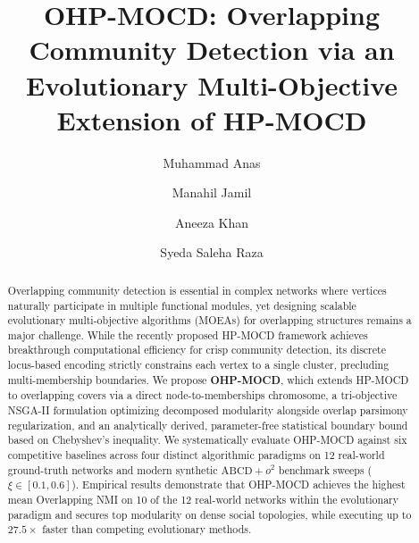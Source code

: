 \documentclass{svproc}
\begin{document}
\mainmatter

\title{OHP-MOCD: Overlapping Community Detection via an Evolutionary Multi-Objective Extension of HP-MOCD}

\author{Muhammad Anas \and Manahil Jamil \and Aneeza Khan  \and Syeda Saleha Raza}


\maketitle

\begin{abstract}
Overlapping community detection is essential in complex networks where vertices naturally participate in multiple functional modules, yet designing scalable evolutionary multi-objective algorithms (MOEAs) for overlapping structures remains a major challenge. While the recently proposed HP-MOCD framework achieves breakthrough computational efficiency for crisp community detection, its discrete locus-based encoding strictly constrains each vertex to a single cluster, precluding multi-membership boundaries. We propose \textbf{OHP-MOCD}, which extends HP-MOCD to overlapping covers via a direct node-to-memberships chromosome, a tri-objective NSGA-II formulation optimizing decomposed modularity alongside overlap parsimony regularization, and an analytically derived, parameter-free statistical boundary bound based on Chebyshev's inequality. We systematically evaluate OHP-MOCD against six competitive baselines across four distinct algorithmic paradigms on 12 real-world ground-truth networks and modern synthetic $\text{ABCD}+o^2$ benchmark sweeps ($\xi \in [0.1, 0.6]$). Empirical results demonstrate that OHP-MOCD achieves the highest mean Overlapping NMI on 10 of the 12 real-world networks within the evolutionary paradigm and secures top modularity on dense social topologies, while executing up to $27.5\times$ faster than competing evolutionary methods.
\end{abstract}

\end{document}
